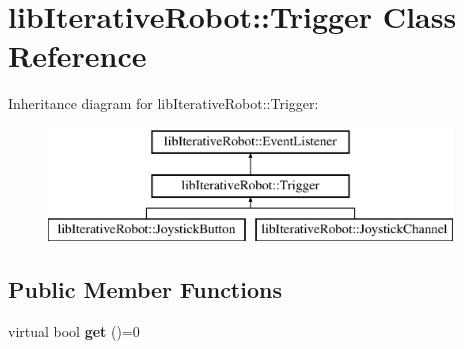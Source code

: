 \hypertarget{classlib_iterative_robot_1_1_trigger}{}\section{lib\+Iterative\+Robot\+::Trigger Class Reference}
\label{classlib_iterative_robot_1_1_trigger}
Inheritance diagram for lib\+Iterative\+Robot\+::Trigger\+:\begin{figure}[H]
\begin{center}
\leavevmode
\includegraphics[height=3.000000cm]{classlib_iterative_robot_1_1_trigger}
\end{center}
\end{figure}
\subsection*{Public Member Functions}
\begin{DoxyCompactItemize}
\item 
\mbox{\label{classlib_iterative_robot_1_1_trigger_a3be8c853558ec5645d8187efef17d6a2}} 
virtual bool {\bfseries get} ()=0
\end{DoxyCompactItemize}
